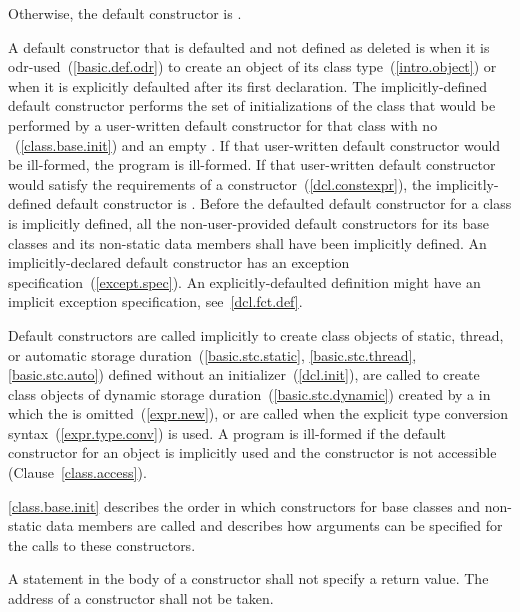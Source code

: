 Otherwise, the default constructor is
.

\pnum
{}%
A default constructor
that is defaulted and not defined as deleted
is
when it is odr-used~(\ref{basic.def.odr})
to create an object of its class type~(\ref{intro.object})
or when it is explicitly defaulted after its first declaration.
The implicitly-defined default constructor performs the set of
initializations of the class that would be performed by a user-written default
constructor for that class with no
~(\ref{class.base.init}) and an empty
.
If that user-written default constructor would be ill-formed,
the program is ill-formed.
If that user-written default constructor would satisfy the requirements
of a  constructor~(\ref{dcl.constexpr}), the implicitly-defined
default constructor is .
Before the defaulted default constructor for a class is
implicitly defined,
all the non-user-provided default constructors for its base classes and
its non-static data members shall have been implicitly defined.
\enternote
An implicitly-declared default constructor has an
exception specification~(\ref{except.spec}).
An explicitly-defaulted definition might have an
implicit exception specification, see~\ref{dcl.fct.def}.
\exitnote

\pnum
{}%
Default constructors are called implicitly to create class objects of static, thread,
or automatic storage duration~(\ref{basic.stc.static}, \ref{basic.stc.thread}, \ref{basic.stc.auto}) defined
without an initializer~(\ref{dcl.init}),
are called to create class objects of dynamic storage duration~(\ref{basic.stc.dynamic}) created by a
in which the
is omitted~(\ref{expr.new}), or
are called when the explicit type conversion syntax~(\ref{expr.type.conv}) is
used.
A program is ill-formed if the default constructor for an object
is implicitly used and the constructor is not accessible (Clause~\ref{class.access}).

\pnum
\enternote
{}%
%
\ref{class.base.init} describes the order in which constructors for base
classes and non-static data members are called and
describes how arguments can be specified for the calls to these constructors.
\exitnote

\pnum
{}%
A
statement in the body of a constructor shall not specify a return value.
%
The address of a constructor shall not be taken.

